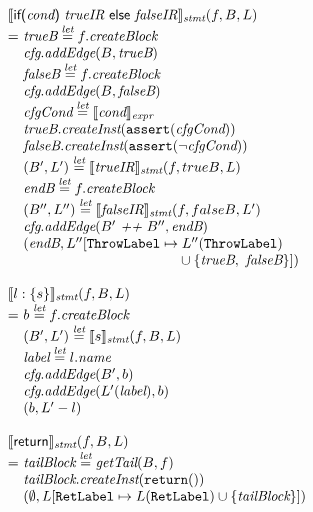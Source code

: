 \[
\begin{array}{l@{}l@{~}l}
\lefteqn{\transfun{\irifelse{\emph{cond}}{\emph{trueIR}}{\emph{falseIR}}}_{\emph{stmt}}(f, B, L)}\\
& = & \emph{trueB} \letval f.\emph{createBlock}\\
& & \emph{cfg}.\emph{addEdge}(B, \emph{trueB})\\
& & \emph{falseB} \letval f.\emph{createBlock}\\
& & \emph{cfg}.\emph{addEdge}(B, \emph{falseB})\\
& & \emph{cfgCond} \letval \transfun{\emph{cond}}_{\emph{expr}}\\
& & \emph{trueB}.\emph{createInst}(\TT{assert}(\emph{cfgCond}))\\
& & \emph{falseB}.\emph{createInst}(\TT{assert}(\neg \emph{cfgCond}))\\
& & (B', L') \letval \transfun{\emph{trueIR}}_{\emph{stmt}}(f, trueB, L)\\
& & \emph{endB} \letval f.\emph{createBlock}\\
& & (B'', L'') \letval \transfun{\emph{falseIR}}_{\emph{stmt}}(f, falseB, L')\\
& & \emph{cfg}.\emph{addEdge}(B' ~\emph{++}~ B'', \emph{endB})\\
& & (\emph{endB}, L''[\ThrowLabel \mapsto L''(\ThrowLabel)\\
& & \phantom{(\emph{endB}, L''[\ThrowLabel \mapsto}
\cup \{ \emph{trueB},\ \emph{falseB} \}])\\
& & \\

\lefteqn{\transfun{\irlabel{l}{s}}_{\emph{stmt}}(f, B, L)}\\
& = & b \letval f.\emph{createBlock}\\
& & (B', L') \letval \transfun{s}_{\emph{stmt}}(f, B, L)\\
& & \emph{label} \letval l.\emph{name}\\
& & \emph{cfg}.\emph{addEdge}(B', b)\\
& & \emph{cfg}.\emph{addEdge}(L'(\emph{label}), b)\\
& & (b, L' - l)\\
& & \\

\lefteqn{\transfun{\mbox{\sf return}}_{\emph{stmt}}(f, B, L)}\\
& = & \emph{tailBlock} \letval \getTail(B, f)\\
& & \emph{tailBlock}.\emph{createInst}(\TT{return}())\\
& & (\emptyset, L[\RetLabel \mapsto L(\RetLabel) \cup \{ \emph{tailBlock}\}])\\
& & \\


\end{array}\]
